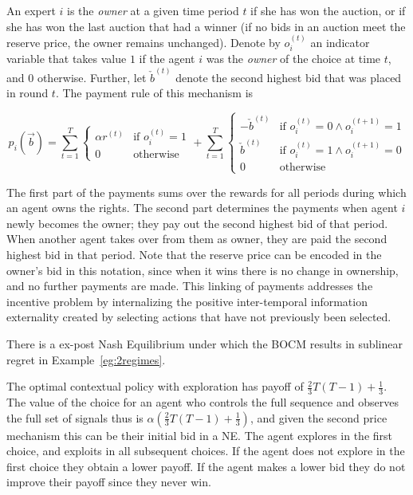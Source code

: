 \begin{mech}
An expert $i$ is the \emph{owner} at a given time period $t$ if she has won the auction, or if she has won the last auction that had a winner (if no bids in an auction meet the reserve price, the owner remains unchanged). 
   Denote by $o^{(t)}_{i}$ an indicator variable that takes value $1$ if the agent $i$ was the \emph{owner} of the choice at time $t$, and $0$ otherwise. Further, let $\check b^{(t)}$ denote the second highest bid that was placed in round $t$. The payment rule of this mechanism is

\[
   p_i(\vec b) =  \sum_{t=1}^T
\begin{cases}
    \alpha r^{(t)} & \text{if } o^{(t)}_{i} = 1\\
    0              & \text{otherwise}
\end{cases}
+
   \sum_{t=1}^T
\begin{cases}
     - \check b^{(t)} & \text{if } o^{(t)}_{i} = 0 \land o^{(t+1)}_{i} = 1\\
      \check b^{(t)} & \text{if } o^{(t)}_{i}= 1 \land o^{(t+1)}_{i} = 0 \\
		0              & \text{otherwise}
\end{cases}
\]

\end{mech}


The first part of the payments sums over the rewards for all periods during which an agent owns the rights.
The second part determines the payments when agent $i$ newly becomes the owner; they pay out the second highest bid of that period. 
When another agent takes over from them as owner, they are paid the second highest bid in that period.
Note that the reserve price can be encoded in the owner's bid in this notation, since when it wins there is no change in ownership, and no further payments are made. 
This linking of payments addresses the incentive problem by internalizing the positive inter-temporal information externality created by selecting actions that have not previously been selected.


\begin{prop}
There is a ex-post Nash Equilibrium under which the BOCM results in sublinear regret in Example~\ref{eg:2regimes}. 
\end{prop}

The optimal contextual policy with exploration has payoff of $\frac{2}{3}T(T-1) + \frac{1}{3}$. The value of the choice for an agent who controls the full sequence and observes the full set of signals thus is $\alpha (\frac{2}{3}T(T-1) + \frac{1}{3})$, and given the second price mechanism this can be their initial bid in a NE.
The agent explores in the first choice, and exploits in all subsequent choices. If the agent does not explore in the first choice they obtain a lower payoff. If the agent makes a lower bid they do not improve their payoff since they never win.



